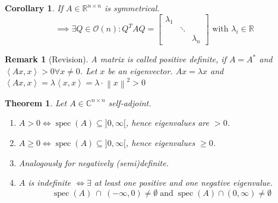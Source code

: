 \documentclass{article}
\newtheorem{theorem}{Theorem}  \numberwithin{theorem}{section}
\newtheorem{remark}{Remark}  \numberwithin{remark}{section}
\newtheorem*{corollary}{Corollary}%
\newcommand{\angel}[1]{\left\langle#1\right\rangle}
\newcommand{\norm}[1]{\left\|#1\right\|}
\begin{document}
\begin{corollary}
  If $A \in \mathbb R^{n \times n}$ is symmetrical.
  \[ \implies \exists Q \in \mathcal O(n): Q^T AQ = \begin{bmatrix} \lambda_1 & & \\ & \ddots & \\ & & \lambda_n \end{bmatrix} \text{ with } \lambda_i \in \mathbb R \]
\end{corollary}

\begin{remark}[Revision]
  A matrix is called positive definite, if $A = A^*$ and $\angel{Ax,x} > 0 \forall x \neq 0$.
  Let $x$ be an eigenvector. $Ax = \lambda x$ and $\angel{Ax,x} = \lambda \angel{x,x} = \lambda \cdot \norm{x}^2 > 0$
\end{remark}

\begin{theorem} %
  Let $A \in \mathbb C^{n \times n}$ self-adjoint.
  \begin{enumerate}
    \item $A > 0 \iff \operatorname{spec}(A) \subseteq ]0,\infty[$, hence eigenvalues are $> 0$.
    \item $A \geq 0 \iff \operatorname{spec}(A) \subseteq ]0, \infty[$, hence eigenvalues $\geq 0$.
    \item Analogously for negatively (semi)definite.
    \item $A$ is indefinite $\iff \exists$ at least one positive and one negative eigenvalue.
      \[ \operatorname{spec}(A) \:\cap\: (-\infty,0) \neq \emptyset \operatorname{ and } \operatorname{spec}(A) \cap (0,\infty) \neq \emptyset \]
  \end{enumerate}
\end{theorem}
\end{document}
